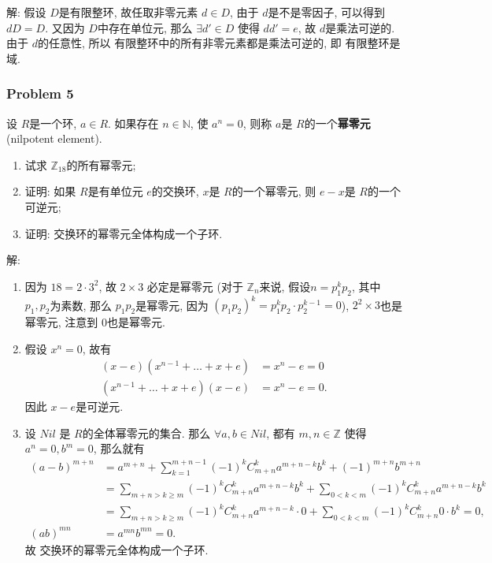 \documentclass[a4paper,12pt]{ctexart}
\newcommand{\Z}{\mathbb{Z}}
\begin{document}
    解: 假设 $ D $是有限整环, 故任取非零元素 $ d\in D $, 由于 $ d $是不是零因子, 可以得到
    $ dD=D $. 又因为 $ D $中存在单位元, 那么 $ \exists d'\in D $ 使得 $ dd'=e $, 故 $ d $是乘法可逆的.
    由于 $ d $的任意性, 所以 有限整环中的所有非零元素都是乘法可逆的, 即 有限整环是域.

\subsubsection*{Problem 5}
  设 $ R $是一个环, $ a\in R $. 如果存在 $ n\in\mathbb{N} $, 使 $ a^n=0 $, 则称 $ a $是 $ R $的一个\textbf{幂零元} (nilpotent element).
  \begin{enumerate}[label=(\arabic{*})]
    \item 试求 $ \Z_{18} $的所有幂零元;
    \item 证明: 如果 $ R $是有单位元 $ e $的交换环, $ x $是 $ R $的一个幂零元, 则 $ e-x $是 $ R $的一个可逆元;
    \item 证明: 交换环的幂零元全体构成一个子环.
  \end{enumerate}

  解: 
  \begin{enumerate}[label=(\arabic{*})]
    \item 因为 $ 18=2\cdot 3^2 $, 故 $ 2\times 3 $ 必定是幂零元 
    (对于 $ \Z_n $来说, 假设$ n=p_1^kp_2 $, 其中 $ p_1,p_2 $为素数, 那么 $ p_1p_2 $是幂零元, 
    因为 $ (p_1p_2)^k=p_1^kp_2\cdot p_2^{k-1}=0 $), $ 2^2\times 3 $也是幂零元, 注意到
    $ 0 $也是幂零元.
    \item 假设 $ x^n=0 $, 故有 
    \begin{align*}
      (x-e)(x^{n-1}+\dots+x+e)&=x^n-e=0\\ 
      (x^{n-1}+\dots+x+e)(x-e)&=x^n-e=0.
    \end{align*}
    因此 $ x-e $是可逆元.
    \item 设 $ Nil $ 是 $ R $的全体幂零元的集合. 那么 $ \forall a,b\in Nil $, 都有 $ m,n\in\Z $ 使得 
    $ a^n=0,b^m=0 $, 那么就有
    \begin{align*}
      (a-b)^{m+n} &=a^{m+n}+\sum_{k=1}^{m+n-1}(-1)^k C_{m+n}^k a^{m+n-k} b^k+(-1)^{m+n} b^{m+n} \\
      &=\sum_{m+n>k \geqslant m}(-1)^k C_{m+n}^k a^{m+n-k} b^k+\sum_{0<k<m}(-1)^k C_{m+n}^k a^{m+n-k} b^k \\
      &=\sum_{m+n>k \geqslant m}(-1)^k C_{m+n}^k a^{m+n-k} \cdot 0+\sum_{0<k<m}(-1)^k C_{m+n}^k 0 \cdot b^k=0, \\
      (a b)^{m n} &=a^{m n} b^{m n}=0 .
      \end{align*}
      故 交换环的幂零元全体构成一个子环.
  \end{enumerate}
\end{document}
